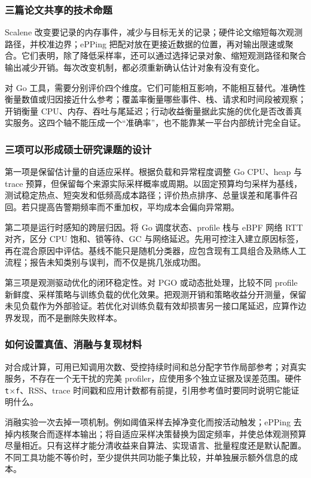 \documentclass[UTF8,fontset=fandol,openany,11pt]{ctexbook}
\begin{document}
\subsubsection{三篇论文共享的技术命题}
Scalene 改变要记录的内存事件，减少与目标无关的记录；硬件论文缩短每次观测路径，并校准边界；ePPing 把配对放在更接近数据的位置，再对输出限速或聚合。它们表明，除了降低采样率，还可以通过选择记录对象、缩短观测路径和聚合输出减少开销。每次改变机制，都必须重新确认估计对象有没有变化。

对 Go 工具，需要分别评价四个维度。它们可能相互影响，不能相互替代。准确性衡量数值或归因接近什么参考；覆盖率衡量哪些事件、栈、请求和时间段被观察；开销衡量 CPU、内存、吞吐与尾延迟；行动收益衡量据此实施的优化是否改善真实服务。这四个轴不能压成一个“准确率”，也不能靠某一平台内部统计完全自证。

\subsubsection{三项可以形成硕士研究课题的设计}
第一项是保留估计量的自适应采样。根据负载和异常程度调整 Go CPU、heap 与 trace 预算，但保留每个来源实际采样概率或周期。以固定预算均匀采样为基线，测试稳定热点、短突发和低频高成本路径；评价热点排序、总量误差和尾事件召回。若只提高告警期频率而不重加权，平均成本会偏向异常期。

第二项是运行时感知的跨层归因。将 Go 调度状态、profile 栈与 eBPF 网络 RTT 对齐，区分 CPU 饱和、锁等待、GC 与网络延迟。先用可控注入建立原因标签，再在混合原因中评估。基线不能只是随机分类器，应包含现有工具组合及熟练人工流程；报告未知类别与误判，而不仅是挑几张成功图。

第三项是观测驱动优化的闭环稳定性。对 PGO 或动态批处理，比较不同 profile 新鲜度、采样策略与训练负载的优化效果。把观测开销和策略收益分开测量，保留未见负载作为外部验证。若优化对训练负载有效却损害另一接口尾延迟，应算作边界发现，而不是删除失败样本。

\subsubsection{如何设置真值、消融与复现材料}
对合成计算，可用已知调用次数、受控持续时间和总分配字节作局部参考；对真实服务，不存在一个无干扰的完美 profiler，应使用多个独立证据及误差范围。硬件 \texttt{t\ensuremath{\times}f}、RSS、trace 时间戳和应用计数都有前提，引用参考值时要同时说明它能证明什么。

消融实验一次去掉一项机制。例如阈值采样去掉净变化而按活动触发；ePPing 去掉内核聚合而逐样本输出；将自适应采样决策替换为固定频率，并使总体观测预算尽量相近。只有这样才能分清收益来自算法、实现语言、批量程度还是默认配置。不同工具功能不等价时，至少提供共同功能子集比较，并单独展示额外信息的成本。
\end{document}
